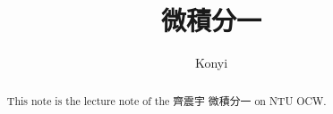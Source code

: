 \documentclass[a4paper]{report}
\author{Konyi}
\title{微積分一}
\begin{document}
\maketitle

\begin{abstract}
This note is the lecture note of the 齊震宇 微積分一 on NTU OCW.
\end{abstract}

\newpage

\tableofcontents


\newpage

%

\newpage
\pagestyle{plain}
\printbibliography{}
\end{document}

